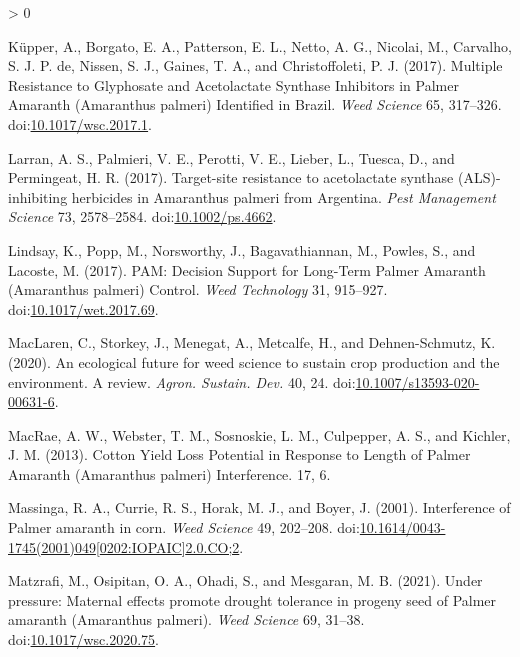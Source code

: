 \documentclass[utf8]{frontiersSCNS}
\newlength{\cslhangindent}
\newenvironment{CSLReferences}[2] %
 {%
  \setlength{\parindent}{0pt}
  \ifodd #1 \everypar{\setlength{\hangindent}{\cslhangindent}}\ignorespaces\fi
  \ifnum #2 > 0
  \setlength{\parskip}{#2\baselineskip}
  \fi
 }%
 {}
\begin{document}
\begin{CSLReferences}{1}{0}
\leavevmode\hypertarget{ref-kupper2017}{}%
Küpper, A., Borgato, E. A., Patterson, E. L., Netto, A. G., Nicolai, M.,
Carvalho, S. J. P. de, Nissen, S. J., Gaines, T. A., and Christoffoleti,
P. J. (2017). Multiple {Resistance} to {Glyphosate} and {Acetolactate
Synthase Inhibitors} in {Palmer Amaranth} ({Amaranthus} palmeri)
{Identified} in {Brazil}. \emph{Weed Science} 65, 317--326.
doi:\href{https://doi.org/10.1017/wsc.2017.1}{10.1017/wsc.2017.1}.

\leavevmode\hypertarget{ref-larran2017}{}%
Larran, A. S., Palmieri, V. E., Perotti, V. E., Lieber, L., Tuesca, D.,
and Permingeat, H. R. (2017). Target-site resistance to acetolactate
synthase ({ALS})-inhibiting herbicides in {Amaranthus} palmeri from
{Argentina}. \emph{Pest Management Science} 73, 2578--2584.
doi:\href{https://doi.org/10.1002/ps.4662}{10.1002/ps.4662}.

\leavevmode\hypertarget{ref-lindsay2017}{}%
Lindsay, K., Popp, M., Norsworthy, J., Bagavathiannan, M., Powles, S.,
and Lacoste, M. (2017). {PAM}: {Decision Support} for {Long}-{Term
Palmer Amaranth} ({Amaranthus} palmeri) {Control}. \emph{Weed
Technology} 31, 915--927.
doi:\href{https://doi.org/10.1017/wet.2017.69}{10.1017/wet.2017.69}.

\leavevmode\hypertarget{ref-maclaren2020}{}%
MacLaren, C., Storkey, J., Menegat, A., Metcalfe, H., and
Dehnen-Schmutz, K. (2020). An ecological future for weed science to
sustain crop production and the environment. {A} review. \emph{Agron.
Sustain. Dev.} 40, 24.
doi:\href{https://doi.org/10.1007/s13593-020-00631-6}{10.1007/s13593-020-00631-6}.

\leavevmode\hypertarget{ref-macrae2013}{}%
MacRae, A. W., Webster, T. M., Sosnoskie, L. M., Culpepper, A. S., and
Kichler, J. M. (2013). Cotton {Yield Loss Potential} in {Response} to
{Length} of {Palmer Amaranth} ({Amaranthus} palmeri) {Interference}. 17,
6.

\leavevmode\hypertarget{ref-massinga2001}{}%
Massinga, R. A., Currie, R. S., Horak, M. J., and Boyer, J. (2001).
Interference of {Palmer} amaranth in corn. \emph{Weed Science} 49,
202--208.
doi:\href{https://doi.org/10.1614/0043-1745(2001)049\%5B0202:IOPAIC\%5D2.0.CO;2}{10.1614/0043-1745(2001)049{[}0202:IOPAIC{]}2.0.CO;2}.

\leavevmode\hypertarget{ref-matzrafi2021}{}%
Matzrafi, M., Osipitan, O. A., Ohadi, S., and Mesgaran, M. B. (2021).
Under pressure: Maternal effects promote drought tolerance in progeny
seed of {Palmer} amaranth ({Amaranthus} palmeri). \emph{Weed Science}
69, 31--38.
doi:\href{https://doi.org/10.1017/wsc.2020.75}{10.1017/wsc.2020.75}.


\end{CSLReferences}
\end{document}
